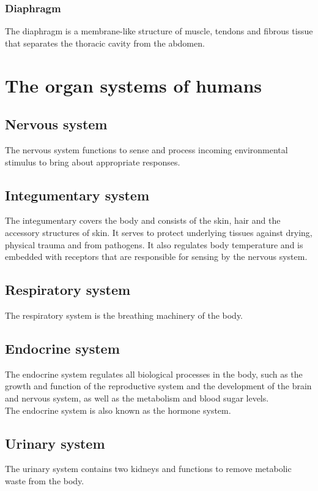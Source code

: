 \documentclass[11pt]{article}
\begin{document}
\subsubsection{Diaphragm}
\label{sec:org49e2125}
The diaphragm is a membrane-like structure of muscle, tendons and fibrous tissue that separates the thoracic cavity from the abdomen.

\section{The organ systems of humans}
\label{sec:orgc993d20}

\subsection{Nervous system}
\label{sec:org9224506}
The nervous system functions to sense and process incoming environmental stimulus to bring about appropriate responses.

\subsection{Integumentary system}
\label{sec:org80e7071}
The integumentary covers the body and consists of the skin, hair and the accessory structures of skin. It serves to protect underlying tissues against drying, physical trauma and from pathogens. It also regulates body temperature and is embedded with receptors that are responsible for sensing by the nervous system.

\subsection{Respiratory system}
\label{sec:orga662819}
The respiratory system is the breathing machinery of the body.

\subsection{Endocrine system}
\label{sec:org0f44300}
The endocrine system regulates all biological processes in the body, such as the growth and function of the reproductive system and the development of the brain and nervous system, as well as the metabolism and blood sugar levels.
\\[0pt]

The endocrine system is also known as the hormone system.

\subsection{Urinary system}
\label{sec:orgeff6a8a}
The urinary system contains two kidneys and functions to remove metabolic waste from the body.
\end{document}
